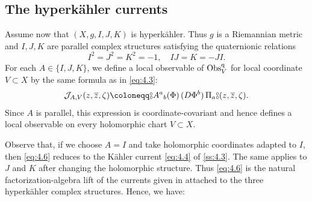 \documentclass[final,reqno]{amsart}
\numberwithin{equation}{section}
\theoremstyle{definition}
\newtheorem{prp}[thm]{Proposition}
\newcommand{\ol}{\overline}
\newcommand{\ceq}{\coloneqq} %
\newcommand{\clH}{\mathcal{H}}
\newcommand{\clJ}{\mathcal{J}}
\newcommand{\qObs}[1]{\mathop{\Obs^{\textup{q}}_{#1}}}
\newcommand{\dbc}{%
 \mathrel{\vcenter{\hbox{\ooalign{%
  \raisebox{0.5ex}{$\scriptstyle \circ$}\cr%
  \raisebox{-0.5ex}{$\scriptstyle \circ$}%
 }}}}%
}
\newcommand{\nod}[1]{\mathopen{\dbc} \mathrel{#1} \mathclose{\dbc}}
\DeclareMathOperator{\Obs}{Obs}
\begin{document}
\subsection{The hyperk\"ahler currents}\label{ss:4.4}

Assume now that $(X,g,I,J,K)$ is hyperk\"ahler. 
Thus $g$ is a Riemannian metric and $I,J,K$ are parallel complex structures
satisfying the quaternionic relations
\[
 I^2=J^2=K^2=-1, \quad IJ=K=-JI.
\]
For each $A \in \{I,J,K\}$, we define a local observable of $\qObs{V}$ 
for local coordinate $V \subset X$ by the same formula as in \cref{eq:4.3}:
\begin{align}\label{eq:4.6}
 \clJ_{A,V}(z,\ol{z},\zeta) \ceq 
 \nod{A^a{}_b(\Phi)\,(D\Phi^b)\,\Pi_a}(z,\ol{z},\zeta).
\end{align}
Since $A$ is parallel, this expression is coordinate-covariant and hence defines
a local observable on every holomorphic chart $V\subset X$.

Observe that, 
if we choose $A=I$ and take holomorphic coordinates adapted to $I$, 
then \cref{eq:4.6} reduces to 
the K\"ahler current \cref{eq:4.4} of \cref{ss:4.3}. 
The same applies to $J$ and $K$ after changing the holomorphic structure. 
Thus \cref{eq:4.6} is the natural factorization-algebra lift of the currents 
given in \cite[\S7]{BHS} attached to the three hyperk\"ahler complex structures.
Hence, we have:


\end{document}
